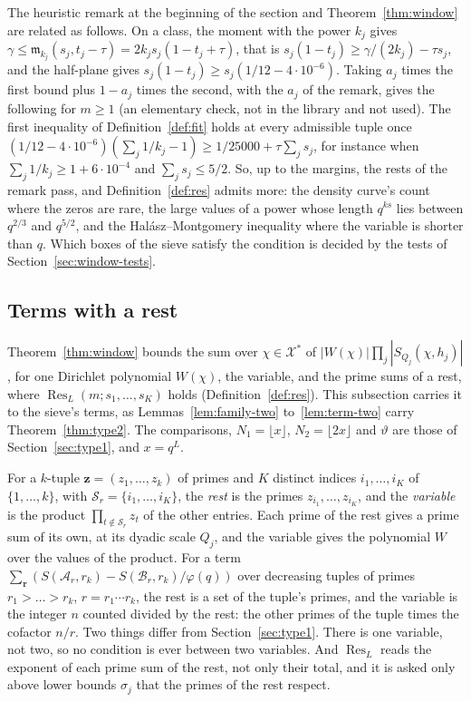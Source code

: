 \documentclass[11pt]{article}
\theoremstyle{definition}
\begin{document}
The heuristic remark at the beginning of the section and Theorem~\ref{thm:window} are related as follows. On a class,
the moment with the power $k_j$ gives $\gamma \le \mathfrak m_{k_j}(s_j, t_j - \tau) = 2k_js_j(1 - t_j + \tau)$, that
is $s_j(1 - t_j) \ge \gamma/(2k_j) - \tau s_j$, and the half-plane gives $s_j(1 - t_j) \ge s_j(1/12 - 4 \cdot
10^{-6})$. Taking $a_j$ times the first bound plus $1 - a_j$ times the second, with the $a_j$ of the remark, gives the
following for $m \ge 1$ (an elementary check, not in the library and not used). The first inequality of
Definition~\ref{def:fit} holds at every admissible tuple once $(1/12 - 4 \cdot 10^{-6})(\sum_j 1/k_j - 1) \ge 1/25000
+ \tau \sum_j s_j$, for instance when $\sum_j 1/k_j \ge 1 + 6 \cdot 10^{-4}$ and $\sum_j s_j \le 5/2$. So, up to the
margins, the
rests of the remark pass, and Definition~\ref{def:res} admits more: the density curve's count where the zeros are rare,
the large values
of a power whose length $q^{ks}$ lies between $q^{2/3}$ and $q^{5/2}$, and the Hal\'asz--Montgomery inequality where
the variable is shorter than $q$. Which boxes of the sieve satisfy the condition is decided by the tests of
Section~\ref{sec:window-tests}.

\subsection{Terms with a rest}\label{sec:window-terms}

Theorem~\ref{thm:window} bounds the sum over $\chi \in \mathcal X^*$ of $|W(\chi)| \prod_j |S_{Q_j}(\chi, h_j)|$, for
one Dirichlet polynomial $W(\chi)$, the variable, and the prime sums of a rest, where $\operatorname{Res}_L(m; s_1,
\dots, s_K)$ holds (Definition~\ref{def:res}). This subsection carries it to the sieve's terms, as
Lemmas~\ref{lem:family-two} to~\ref{lem:term-two} carry Theorem~\ref{thm:type2}. The comparisons, $N_1 = \lfloor x
\rfloor$, $N_2 = \lfloor 2x \rfloor$ and $\vartheta$ are those of Section~\ref{sec:type1}, and $x = q^L$.

For a $k$-tuple $\mathbf z = (z_1, \dots, z_k)$ of primes and $K$ distinct indices $i_1, \dots, i_K$ of $\{1, \dots,
k\}$, with $\mathcal S_r = \{i_1, \dots, i_K\}$, the \emph{rest} is the primes $z_{i_1}, \dots, z_{i_K}$, and the
\emph{variable} is the product $\prod_{t \notin \mathcal S_r} z_t$ of the other entries. Each prime of the rest gives a
prime sum of its own, at its dyadic scale $Q_j$, and the variable gives the polynomial $W$ over the values of the
product. For a term $\sum_{\mathbf r} (S(\mathcal A_r, r_k) - S(\mathcal B_r, r_k)/\varphi(q))$ over decreasing tuples
of primes $r_1 > \dots > r_k$, $r = r_1 \cdots r_k$, the rest is a set of the tuple's primes, and the variable is the
integer $n$ counted divided by the rest: the other primes of the tuple times the cofactor $n/r$. Two things differ from
Section~\ref{sec:type1}. There is one variable, not two, so no condition is ever between two variables. And
$\operatorname{Res}_L$ reads the exponent of each prime sum of the rest, not only their total, and it is asked only
above lower bounds $\sigma_j$ that the primes of the rest respect.
\end{document}
